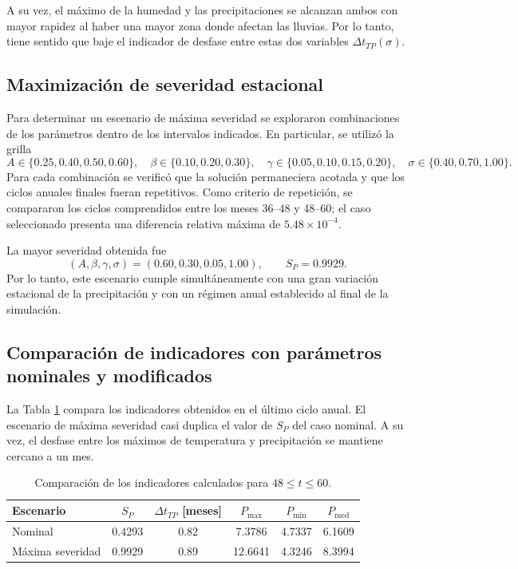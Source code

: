A su vez, el máximo de la humedad y las precipitaciones se alcanzan ambos con mayor rapidez al haber una mayor zona donde afectan las lluvias. Por lo tanto, tiene sentido que baje el indicador de desfase entre estas dos variables $\Delta t_{TP}(\sigma)$.

\subsection{Maximización de severidad estacional}

Para determinar un escenario de máxima severidad se exploraron combinaciones
de los parámetros dentro de los intervalos indicados. En particular, se utilizó
la grilla
\[
A\in\{0.25,0.40,0.50,0.60\},\quad
\beta\in\{0.10,0.20,0.30\},\quad
\gamma\in\{0.05,0.10,0.15,0.20\},\quad
\sigma\in\{0.40,0.70,1.00\}.
\]
Para cada combinación se verificó que la solución permaneciera acotada y que
los ciclos anuales finales fueran repetitivos. Como criterio de repetición, se
compararon los ciclos comprendidos entre los meses 36--48 y 48--60; el caso
seleccionado presenta una diferencia relativa máxima de $5.48\times10^{-4}$.

La mayor severidad obtenida fue
\[
(A,\beta,\gamma,\sigma)=(0.60,0.30,0.05,1.00),
\qquad S_P=0.9929.
\]
Por lo tanto, este escenario cumple simultáneamente con una gran variación
estacional de la precipitación y con un régimen anual establecido al final de
la simulación.

\subsection{Comparación de indicadores con parámetros nominales y modificados}

La Tabla \ref{tab:comparacion-maxima} compara los indicadores obtenidos en el
último ciclo anual. El escenario de máxima severidad casi duplica el valor de
$S_P$ del caso nominal. A su vez, el desfase entre los máximos de temperatura
y precipitación se mantiene cercano a un mes.

\begin{table}[H]
    \centering
    \caption{Comparación de los indicadores calculados para $48\leq t\leq60$.}
    \label{tab:comparacion-maxima}
    \begin{tabular}{lccccc}
        \hline
        Escenario & $S_P$ & $\Delta t_{TP}$ [meses] & $P_{\max}$ & $P_{\min}$ & $P_{\mathrm{med}}$ \\
        \hline
        Nominal & 0.4293 & 0.82 & 7.3786 & 4.7337 & 6.1609 \\
        Máxima severidad & 0.9929 & 0.89 & 12.6641 & 4.3246 & 8.3994 \\
        \hline
    \end{tabular}
\end{table}

